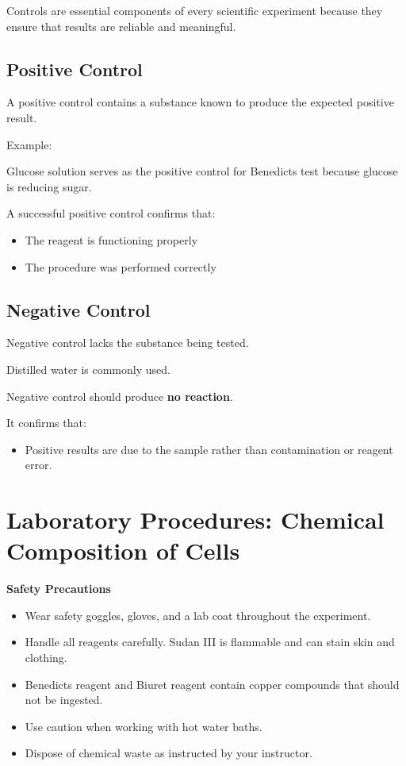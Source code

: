 \documentclass[
  letterpaper,
  DIV=11,
  numbers=noendperiod]{scrreprt}
\providecommand{\tightlist}{%
  \setlength{\itemsep}{0pt}\setlength{\parskip}{0pt}}
\begin{document}
Controls are essential components of every scientific experiment because
they ensure that results are reliable and meaningful.

\subsection{\texorpdfstring{\textbf{Positive
Control}}{Positive Control}}\label{positive-control}

A positive control contains a substance known to produce the expected
positive result.

Example:

Glucose solution serves as the positive control for
Benedict\textquotesingle s test because glucose is reducing sugar.

A successful positive control confirms that:

\begin{itemize}
\item
  The reagent is functioning properly
\item
  The procedure was performed correctly
\end{itemize}

\subsection{\texorpdfstring{\textbf{Negative
Control}}{Negative Control}}\label{negative-control}

Negative control lacks the substance being tested.

Distilled water is commonly used.

Negative control should produce \textbf{no reaction}.

It confirms that:

\begin{itemize}
\tightlist
\item
  Positive results are due to the sample rather than contamination or
  reagent error.
\end{itemize}

\section{\texorpdfstring{\textbf{Laboratory Procedures: Chemical
Composition of
Cells}}{Laboratory Procedures: Chemical Composition of Cells}}\label{laboratory-procedures-chemical-composition-of-cells}

\textbf{Safety Precautions}

\begin{itemize}
\item
  Wear safety goggles, gloves, and a lab coat throughout the experiment.
\item
  Handle all reagents carefully. Sudan III is flammable and can stain
  skin and clothing.
\item
  Benedict\textquotesingle s reagent and Biuret reagent contain copper
  compounds that should not be ingested.
\item
  Use caution when working with hot water baths.
\item
  Dispose of chemical waste as instructed by your instructor.
\end{itemize}
\end{document}
